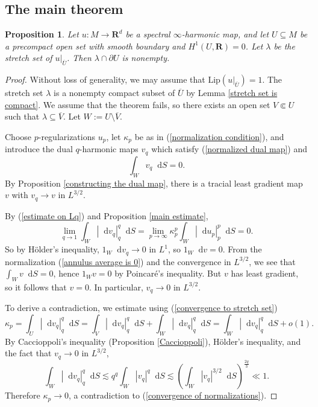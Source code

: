 \documentclass[reqno,11pt]{amsart}
\newcommand{\RR}{\mathbf{R}}
\newcommand*\dif{\mathop{}\!\mathrm{d}}
\newcommand{\Lip}{\mathrm{Lip}}
\newtheorem{proposition}[theorem]{Proposition}
\theoremstyle{definition}
\numberwithin{equation}{section}
\begin{document}
\subsection{The main theorem}
\begin{proposition}\label{main prop}
Let $u: M \to \RR^d$ be a spectral $\infty$-harmonic map, and let $U \subseteq M$ be a precompact open set with smooth boundary and $H^1(U, \RR) = 0$.
Let $\lambda$ be the stretch set of $u|_{\overline U}$.
Then $\lambda \cap \partial U$ is nonempty.
\end{proposition}
\begin{proof}
Without loss of generality, we may assume that $\Lip(u|_{\overline U}) = 1$.
The stretch set $\lambda$ is a nonempty compact subset of $\overline U$ by Lemma \ref{stretch set is compact}.
We assume that the theorem fails, so there exists an open set $V \Subset U$ such that $\lambda \subseteq \overline V$.
Let $W := U \setminus \overline V$.

Choose $p$-regularizations $u_p$, let $\kappa_p$ be as in (\ref{normalization condition}), and introduce the dual $q$-harmonic maps $v_q$ which satisfy (\ref{normalized dual map}) and 
\begin{equation}\label{annulus average is 0}
\int_W v_q \dif S = 0.
\end{equation}
By Proposition \ref{constructing the dual map}, there is a tracial least gradient map $v$ with $v_q \to v$ in $L^{3/2}$.

By (\ref{estimate on Lq}) and Proposition \ref{main estimate},
\begin{equation}\label{convergence to stretch set}
\lim_{q \to 1} \int_W |\dif v_q|_{q}^q \dif S = \lim_{p \to \infty} \kappa_p^p \int_W |\dif u_p|_{p}^p \dif S = 0.
\end{equation}
So by H\"older's inequality, $1_W \dif v_q \to 0$ in $L^1$, so $1_W \dif v = 0$.
From the normalization (\ref{annulus average is 0}) and the convergence in $L^{3/2}$, we see that $\int_W v \dif S = 0$, hence $1_W v = 0$ by Poincar\'e's inequality.
But $v$ has least gradient, so it follows that $v = 0$.
In particular, $v_q \to 0$ in $L^{3/2}$.

To derive a contradiction, we estimate using (\ref{convergence to stretch set})
$$\kappa_p = \int_U |\dif v_q|_{q}^q \dif S = \int_V |\dif v_q|_{q}^q \dif S + \int_W |\dif v_q|_{q}^q \dif S = \int_W |\dif v_q|_q^q \dif S + o(1).$$
By Caccioppoli's inequality (Proposition \ref{Caccioppoli}), H\"older's inequality, and the fact that $v_q \to 0$ in $L^{3/2}$,
$$\int_W |\dif v_q|_q^q \dif S \lesssim q^q \int_W |v_q|^q \dif S \lesssim \left(\int_W |v_q|^{3/2} \dif S\right)^{\frac{2q}{3}} \ll 1.$$
Therefore $\kappa_p \to 0$, a contradiction to (\ref{convergence of normalizations}).
\end{proof}
\end{document}

